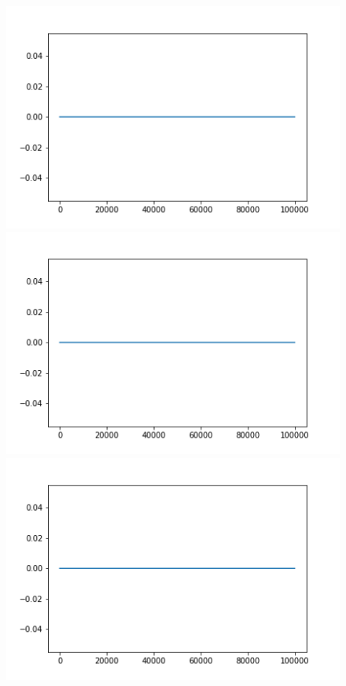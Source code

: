 \documentclass[letter, 10pt]{article}
\begin{document}
\begin{figure}[H]
        \centering
        \includegraphics[width=\textwidth]{HW5/a.png}
    \endminipage\hfill
        \centering
        \includegraphics[width=1.1\textwidth]{HW5/b.png}
    \endminipage\hfill
        \centering
        \includegraphics[width=1.1\textwidth]{HW5/c.png}

\end{figure}
\end{document}
